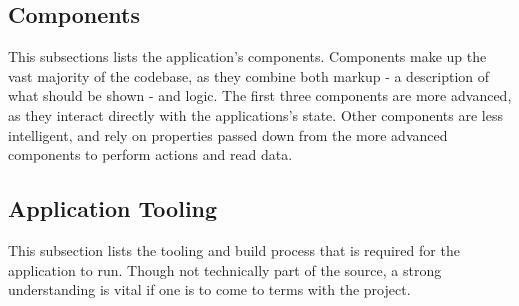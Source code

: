 \subsection{Components} %
\label{sub:reducers}
This subsections lists the application's components. Components make up the vast majority of the codebase, as they combine both markup - a description of what should be shown - and logic. The first three components are more advanced, as they interact directly with the applications's state. Other components are less intelligent, and rely on properties passed down from the more advanced components to perform actions and read data.


\subsection{Application Tooling} %
\label{sub:api_models}
This subsection lists the tooling and build process that is required for the application to run. Though not technically part of the source, a strong understanding is vital if one is to come to terms with the project.

